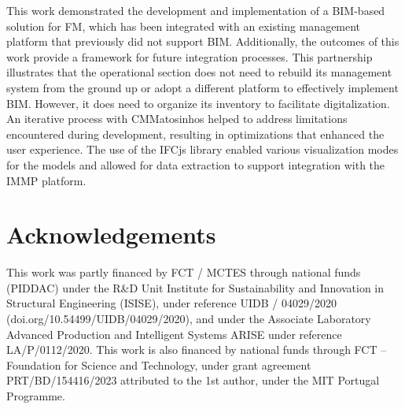 \documentclass[a4paper, 10pt, twocolumn, twoside]{article}
\begin{document}
This work demonstrated the development and implementation of a BIM-based solution for FM, which has been integrated with an existing management platform that previously did not support BIM. Additionally, the outcomes of this work provide a framework for future integration processes. This partnership illustrates that the operational section does not need to rebuild its management system from the ground up or adopt a different platform to effectively implement BIM. However, it does need to organize its inventory to facilitate digitalization. An iterative process with CMMatosinhos helped to address limitations encountered during development, resulting in optimizations that enhanced the user experience. The use of the IFCjs library enabled various visualization modes for the models and allowed for data extraction to support integration with the IMMP platform.

\section{Acknowledgements}
\label{sec:acknowledgements}

This work was partly financed by FCT / MCTES through national funds (PIDDAC) under the R\&D Unit Institute for Sustainability and Innovation in Structural Engineering (ISISE), under reference UIDB / 04029/2020 (doi.org/10.54499/UIDB/04029/2020), and under the Associate Laboratory Advanced Production and Intelligent Systems ARISE under reference LA/P/0112/2020. This work is also financed by national funds through FCT – Foundation for Science and Technology, under grant agreement PRT/BD/154416/2023 attributed to the 1st author, under the MIT Portugal Programme.


\end{document}
